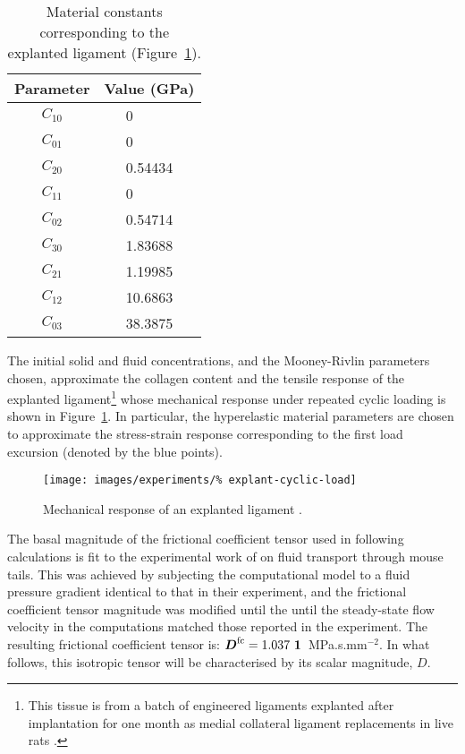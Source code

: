 \begin{table}[!hptb]
  \centering
  \begin{tabular}{|c|c|}
    \hline Parameter & Value (GPa) \\
    \hline \hline
    $C_{10}$  &   0$\phantom{.00000}$  \\
    $C_{01}$  &   0$\phantom{.00000}$  \\
    $C_{20}$  &   0.54434  \\
    $C_{11}$  &   0$\phantom{.00000}$  \\
    $C_{02}$  &   0.54714  \\
    $C_{30}$  &   1.83688  \\
    $C_{21}$  &   1.19985  \\
    $C_{12}$  &   10.6863  \\
    $C_{03}$  &   38.3875  \\
    \hline
  \end{tabular}
  \caption{Material constants corresponding to the explanted
    ligament (Figure~\ref{explanted-ligament}).}
  \label{parameters-explant}
\end{table}

The initial solid and fluid concentrations, and the Mooney-Rivlin
parameters chosen, approximate the collagen content and the tensile
response of the explanted ligament\footnote{This tissue is from a
  batch of engineered ligaments explanted after implantation for one
  month as medial collateral ligament replacements in live rats
  \citep{Syed-Picard:06}.} whose mechanical response under repeated
cyclic loading is shown in Figure~\ref{explanted-ligament}. In
particular, the hyperelastic material parameters are chosen to
approximate the stress-strain response corresponding to the first load
excursion (denoted by the blue points).

\begin{figure}[!hptb]
  \centering
  \texttt{[image: images/experiments/\%
    explant-cyclic-load]}
  \caption{Mechanical response of an explanted ligament
    \citep{Syed-Picard:06}.}
  \label{explanted-ligament}
\end{figure}

The basal magnitude of the frictional coefficient tensor used in
following calculations is fit to the experimental work of
\citet{Swartzetal:99} on fluid transport through mouse tails. This was
achieved by subjecting the computational model to a fluid pressure
gradient identical to that in their experiment, and the frictional
coefficient tensor magnitude was modified until the until the
steady-state flow velocity in the computations matched those reported
in the experiment. The resulting frictional coefficient tensor is:
$\bD^{\mathrm{fc}} = 1.037 \ \bone$~MPa.s.mm$^{-2}$. In what follows,
this isotropic tensor will be characterised by its scalar magnitude,
$D$.

